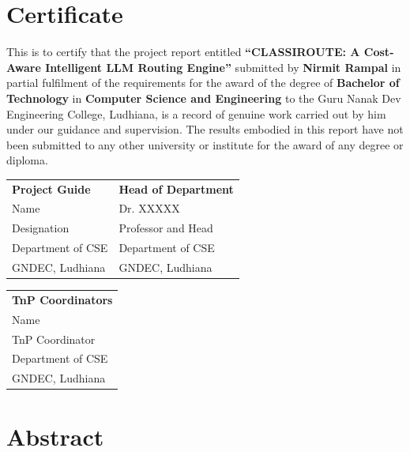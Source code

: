 \documentclass[oneside,12pt,a4paper]{report}
\begin{document}
\chapter*{Certificate}

\noindent This is to certify that the project report entitled \textbf{``CLASSIROUTE: A Cost-Aware Intelligent LLM Routing Engine''} submitted by \textbf{Nirmit Rampal} in partial fulfilment of the requirements for the award of the degree of \textbf{Bachelor of Technology} in \textbf{Computer Science and Engineering} to the Guru Nanak Dev Engineering College, Ludhiana, is a record of genuine work carried out by him under our guidance and supervision. The results embodied in this report have not been submitted to any other university or institute for the award of any degree or diploma.

\vspace{2cm}

\noindent
\begin{tabular}{p{5cm}p{5cm}}
\textbf{Project Guide} & \textbf{Head of Department} \\[0.5cm]
Name & Dr. XXXXX \\[0.2cm]
Designation & Professor and Head \\[0.2cm]
Department of CSE & Department of CSE \\[0.2cm]
GNDEC, Ludhiana & GNDEC, Ludhiana
\end{tabular}

\vspace{1cm}

\noindent
\begin{tabular}{p{5cm}}
\textbf{TnP Coordinators} \\[0.5cm]
Name \\[0.2cm]
TnP Coordinator \\[0.2cm]
Department of CSE \\[0.2cm]
GNDEC, Ludhiana
\end{tabular}

\chapter*{Abstract}
\end{document}
